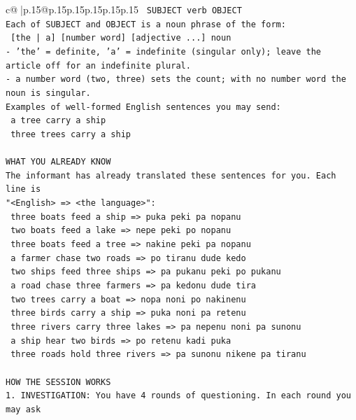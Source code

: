 \documentclass{article}
\begin{document}
{\begin{supertabular}{c@{$\;$}|p{.15\linewidth}@{}p{.15\linewidth}p{.15\linewidth}p{.15\linewidth}p{.15\linewidth}p{.15\linewidth}}
{{{\texttt{    SUBJECT  verb  OBJECT} \\
\texttt{Each of SUBJECT and OBJECT is a noun phrase of the form:} \\
\texttt{    {[}the | a{]}  {[}number word{]}  {[}adjective ...{]}  noun} \\
\texttt{{-} 'the' = definite, 'a' = indefinite (singular only); leave the article off for an indefinite plural.} \\
\texttt{{-} a number word (two, three) sets the count; with no number word the noun is singular.} \\
\texttt{Examples of well{-}formed English sentences you may send:} \\
\texttt{    a tree carry a ship} \\
\texttt{    three trees carry a ship} \\
\\ 
\texttt{WHAT YOU ALREADY KNOW} \\
\texttt{The informant has already translated these sentences for you. Each line is} \\
\texttt{"<English>  =>  <the language>":} \\
\texttt{    three boats feed a ship  =>  puka peki pa nopanu} \\
\texttt{    two boats feed a lake  =>  nepe peki po nopanu} \\
\texttt{    three boats feed a tree  =>  nakine peki pa nopanu} \\
\texttt{    a farmer chase two roads  =>  po tiranu dude kedo} \\
\texttt{    two ships feed three ships  =>  pa pukanu peki po pukanu} \\
\texttt{    a road chase three farmers  =>  pa kedonu dude tira} \\
\texttt{    two trees carry a boat  =>  nopa noni po nakinenu} \\
\texttt{    three birds carry a ship  =>  puka noni pa retenu} \\
\texttt{    three rivers carry three lakes  =>  pa nepenu noni pa sunonu} \\
\texttt{    a ship hear two birds  =>  po retenu kadi puka} \\
\texttt{    three roads hold three rivers  =>  pa sunonu nikene pa tiranu} \\
\\ 
\texttt{HOW THE SESSION WORKS} \\
\texttt{1. INVESTIGATION: You have 4 rounds of questioning. In each round you may ask} \\
}}}
\end{supertabular}}
\end{document}
